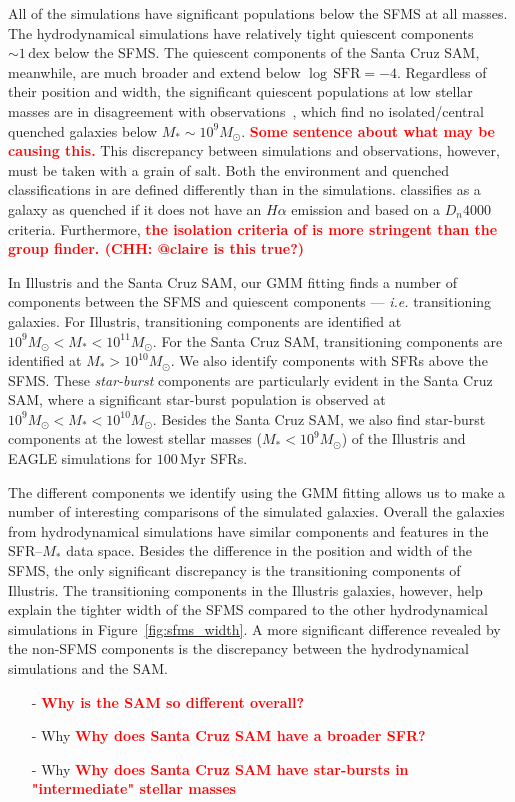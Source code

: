 \documentclass[preprint2,tighten]{aastex62}
\newcommand{\todo}[1]{{\bf \textcolor{red}{ #1}}}
\begin{document}
All of the simulations have significant populations below the SFMS at all 
masses. The hydrodynamical simulations have relatively tight quiescent components 
$\sim 1\,\mathrm{dex}$ below the SFMS. The quiescent components of the 
Santa Cruz SAM, meanwhile, are much broader and extend below 
$\log\,\mathrm{SFR} = -4$. Regardless of their position and width, the 
significant quiescent populations at low stellar masses are in disagreement
with observations~\citep{geha2012}, which find no isolated/central quenched 
galaxies below $M_* \sim 10^9 M_\odot$. 
\todo{Some sentence about what may be causing this.}
This discrepancy between simulations and observations, however, must be 
taken with a grain of salt. Both the environment and quenched classifications 
in \cite{geha2012} are defined differently than in the simulations. 
\cite{geha2012} classifies as a galaxy as quenched if it
does not have an $H\alpha$ emission and based on a $D_n 4000$ criteria. 
Furthermore, \todo{the isolation criteria of \cite{geha2012} is more 
stringent than the group finder. (CHH: @claire is this true?)} 

In Illustris and the Santa Cruz SAM, our GMM fitting
finds a number of components between the SFMS and quiescent components ---
\emph{i.e.} transitioning galaxies. For Illustris, transitioning components 
are identified at $10^9 M_\odot < M_* < 10^{11}M_\odot$. For the Santa Cruz SAM, 
transitioning components are identified at $M_* > 10^{10} M_\odot$. We also 
identify components with SFRs above the SFMS. These \emph{star-burst} 
components are particularly evident in the Santa Cruz SAM, where a significant
star-burst population is observed at $10^9 M_\odot < M_* < 10^{10} M_\odot$. 
Besides the Santa Cruz SAM, we also find star-burst components at the lowest
stellar masses ($M_* < 10^9 M_\odot$) of the Illustris and EAGLE simulations 
for $100\,\mathrm{Myr}$ SFRs. 

The different components we identify using the GMM fitting allows us to make a 
number of interesting comparisons of the simulated galaxies. Overall
the galaxies from hydrodynamical simulations have similar components
and features in the SFR--$M_*$ data space. Besides the difference in the 
position and width of the SFMS, 
the only significant discrepancy is the transitioning components of
Illustris. The transitioning components in the Illustris galaxies, however, 
help explain the tighter width of the SFMS compared to the other hydrodynamical 
simulations in Figure~\ref{fig:sfms_width}. A more significant difference 
revealed by the non-SFMS components is the discrepancy between the hydrodynamical 
simulations and the SAM. 
\begin{itemize}
    \item[-] \todo{Why is the SAM so different overall?}
    \item[-] Why \todo{Why does Santa Cruz SAM have a broader SFR?} 
    \item[-] Why \todo{Why does Santa Cruz SAM have star-bursts in "intermediate" stellar masses}
\end{itemize}
\end{document}
